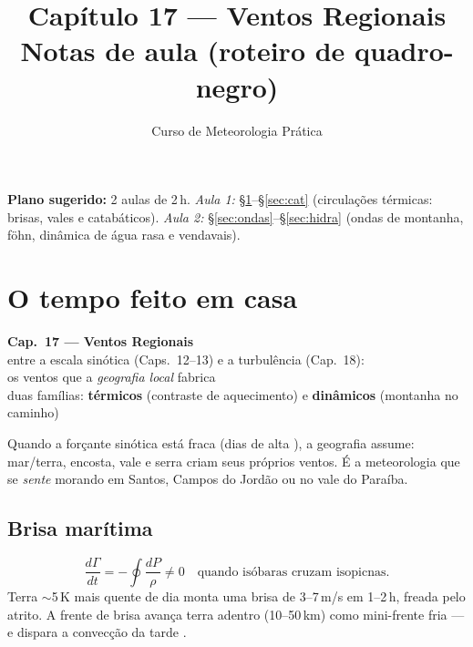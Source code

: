 \documentclass[11pt]{article}
\title{Capítulo 17 --- Ventos Regionais\\
{\large Notas de aula (roteiro de quadro-negro)}}
\author{Curso de Meteorologia Prática}
\date{}
\begin{document}
\maketitle
\thispagestyle{fancy}

\noindent\textbf{Plano sugerido:} 2 aulas de 2\,h.
\emph{Aula 1:} \S\ref{sec:termicos}--\S\ref{sec:cat} (circulações
térmicas: brisas, vales e catabáticos).
\emph{Aula 2:} \S\ref{sec:ondas}--\S\ref{sec:hidra} (ondas de montanha,
föhn, dinâmica de água rasa e vendavais).

\section{O tempo feito em casa}\label{sec:termicos}

\begin{noquadro}[abertura]
\textbf{Cap.~17 --- Ventos Regionais}\\[2pt]
entre a escala sinótica (Caps.~12--13) e a turbulência (Cap.~18):\\
os ventos que a \emph{geografia local} fabrica\\[2pt]
duas famílias: \textbf{térmicos} (contraste de aquecimento) e
\textbf{dinâmicos} (montanha no caminho)
\end{noquadro}

Quando a forçante sinótica está fraca (dias de alta
), a geografia assume: mar/terra, encosta,
vale e serra criam seus próprios ventos. É a meteorologia que se
\emph{sente} morando em Santos, Campos do Jordão ou no vale do
Paraíba.

\subsection{Brisa marítima}


\begin{formadif}
\[ \frac{d\Gamma}{dt} = -\oint\frac{dP}{\rho} \neq 0
\quad\text{quando isóbaras cruzam isopicnas.} \]
Terra $\sim$5\,K mais quente de dia  monta uma
brisa de 3--7\,m/s em 1--2\,h, freada pelo atrito. A frente de brisa
avança terra adentro (10--50\,km) como mini-frente fria
 — e dispara a convecção da tarde
.
\end{formadif}
\end{document}
